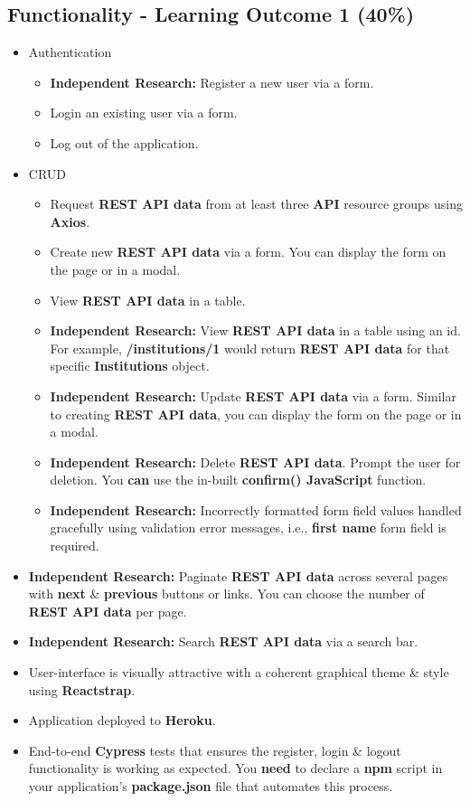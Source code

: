 \documentclass{article}
\begin{document}
\subsection*{Functionality - Learning Outcome 1 (40\%)}
\begin{itemize}
  \item Authentication
        \begin{itemize}
          \item \textbf{Independent Research:} Register a new user via a form.
          \item Login an existing user via a form.
          \item Log out of the application.
        \end{itemize}
  \item CRUD
        \begin{itemize}
          \item Request \textbf{REST API data} from at least three \textbf{API} resource groups using \textbf{Axios}.
          \item Create new \textbf{REST API data} via a form. You can display the form on the page or in a modal.
          \item View \textbf{REST API data} in a table.
          \item \textbf{Independent Research:} View \textbf{REST API data} in a table using an id. For example, \textbf{/institutions/1} would return \textbf{REST API data} for that specific \textbf{Institutions} object.
          \item \textbf{Independent Research:} Update \textbf{REST API data} via a form. Similar to creating \textbf{REST API data}, you can display the form on the page or in a modal.
          \item \textbf{Independent Research:} Delete \textbf{REST API data}. Prompt the user for deletion. You \textbf{can} use the in-built \textbf{confirm() JavaScript} function.
          \item \textbf{Independent Research:} Incorrectly formatted form field values handled gracefully using validation error messages, i.e., \textbf{first name} form field is required.
        \end{itemize}
  \item \textbf{Independent Research:} Paginate \textbf{REST API data} across several pages with \textbf{next} \& \textbf{previous} buttons or links. You can choose the number of \textbf{REST API data} per page.
  \item \textbf{Independent Research:} Search \textbf{REST API data} via a search bar.
  \item User-interface is visually attractive with a coherent graphical theme \& style using \textbf{Reactstrap}.
  \item Application deployed to \textbf{Heroku}.
  \item End-to-end \textbf{Cypress} tests that ensures the register, login \& logout functionality is working as expected. You \textbf{need} to declare a \textbf{npm} script in your application's \textbf{package.json} file that automates this process.
\end{itemize}
\end{document}
